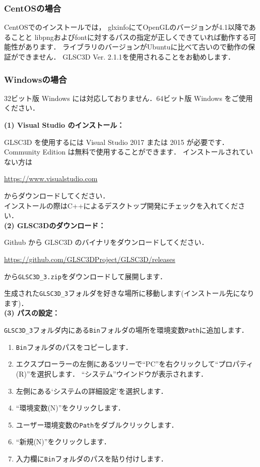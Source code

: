 \documentclass[platex,a4paper,12pt]{jsarticle}%
\begin{document}
\subsubsection{CentOSの場合}

CentOSでのインストールでは，
glxinfoにてOpenGLのバージョンが4.1以降であることと
libpngおよびfontに対するパスの指定が正しくできていれば動作する可能性があります．
ライブラリのバージョンがUbuntuに比べて古いので動作の保証ができません．
GLSC3D Ver. 2.1.1を使用されることをお勧めします．

\newpage
\subsubsection{Windowsの場合}

32ビット版 Windows には対応しておりません．64ビット版 Windows をご使用ください．

\noindent \textbf{(1) Visual Studio のインストール：} 

GLSC3D を使用するには Visual Studio 2017 または 2015 が必要です．
Community Edition は無料で使用することができます．
インストールされていない方は
\begin{center}
	\url{https://www.visualstudio.com}
\end{center}
からダウンロードしてください．\\
インストールの際はC++によるデスクトップ開発にチェックを入れてください．\\

\noindent \textbf{(2) GLSC3Dのダウンロード：} 

Github から GLSC3D のバイナリをダウンロードしてください．
\begin{center}
	\url{https://github.com/GLSC3DProject/GLSC3D/releases}
\end{center}
から\verb|GLSC3D_3.zip|をダウンロードして展開します．

生成された\verb|GLSC3D_3|フォルダを好きな場所に移動します(インストール先になります)．\\

\noindent \textbf{(3) パスの設定：} 

\verb|GLSC3D_3|フォルダ内にある\verb|Bin|フォルダの場所を環境変数\verb|Path|に追加します．
\begin{enumerate}
	\item \verb|Bin|フォルダのパスをコピーします．
	\item エクスプローラーの左側にあるツリーで``PC''を右クリックして``プロパティ(R)''を選択します．
		  ``システム''ウインドウが表示されます．
	\item 左側にある`システムの詳細設定'を選択します．
	\item ``環境変数(N)''をクリックします．
	\item ユーザー環境変数の\verb|Path|をダブルクリックします．
	\item ``新規(N)''をクリックします．
	\item 入力欄に\verb|Bin|フォルダのパスを貼り付けします．
\end{enumerate}
\end{document}
